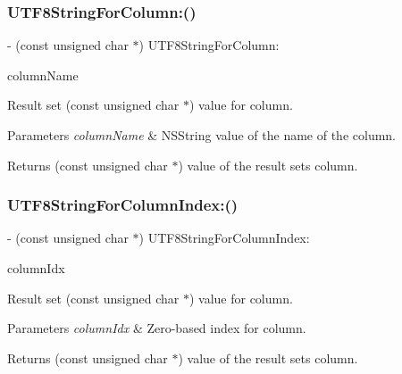 \subsubsection{\texorpdfstring{U\+T\+F8\+String\+For\+Column\+:()}{UTF8StringForColumn:()}}
{\footnotesize\ttfamily -\/ (const unsigned char $\ast$) U\+T\+F8\+String\+For\+Column\+: \begin{DoxyParamCaption}\item[{(N\+S\+String$\ast$)}]{column\+Name }\end{DoxyParamCaption}}

Result set {\ttfamily (const unsigned char $\ast$)} value for column.


\begin{DoxyParams}{Parameters}
{\em column\+Name} & {\ttfamily N\+S\+String} value of the name of the column.\\
\hline
\end{DoxyParams}
\begin{DoxyReturn}{Returns}
{\ttfamily (const unsigned char $\ast$)} value of the result set\textquotesingle{}s column. 
\end{DoxyReturn}
\mbox{\label{interface_o_p_t_l_y_f_m_d_b_result_set_a7a6aeb37554ce04a0573ef4007110df4}} 
\subsubsection{\texorpdfstring{U\+T\+F8\+String\+For\+Column\+Index\+:()}{UTF8StringForColumnIndex:()}}
{\footnotesize\ttfamily -\/ (const unsigned char $\ast$) U\+T\+F8\+String\+For\+Column\+Index\+: \begin{DoxyParamCaption}\item[{(int)}]{column\+Idx }\end{DoxyParamCaption}}

Result set {\ttfamily (const unsigned char $\ast$)} value for column.


\begin{DoxyParams}{Parameters}
{\em column\+Idx} & Zero-\/based index for column.\\
\hline
\end{DoxyParams}
\begin{DoxyReturn}{Returns}
{\ttfamily (const unsigned char $\ast$)} value of the result set\textquotesingle{}s column. 
\end{DoxyReturn}


